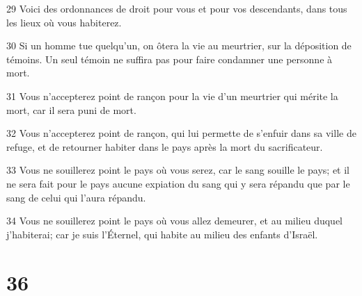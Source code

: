 \par 29 Voici des ordonnances de droit pour vous et pour vos descendants, dans tous les lieux où vous habiterez.
\par 30 Si un homme tue quelqu'un, on ôtera la vie au meurtrier, sur la déposition de témoins. Un seul témoin ne suffira pas pour faire condamner une personne à mort.
\par 31 Vous n'accepterez point de rançon pour la vie d'un meurtrier qui mérite la mort, car il sera puni de mort.
\par 32 Vous n'accepterez point de rançon, qui lui permette de s'enfuir dans sa ville de refuge, et de retourner habiter dans le pays après la mort du sacrificateur.
\par 33 Vous ne souillerez point le pays où vous serez, car le sang souille le pays; et il ne sera fait pour le pays aucune expiation du sang qui y sera répandu que par le sang de celui qui l'aura répandu.
\par 34 Vous ne souillerez point le pays où vous allez demeurer, et au milieu duquel j'habiterai; car je suis l'Éternel, qui habite au milieu des enfants d'Israël.

\chapter{36}

